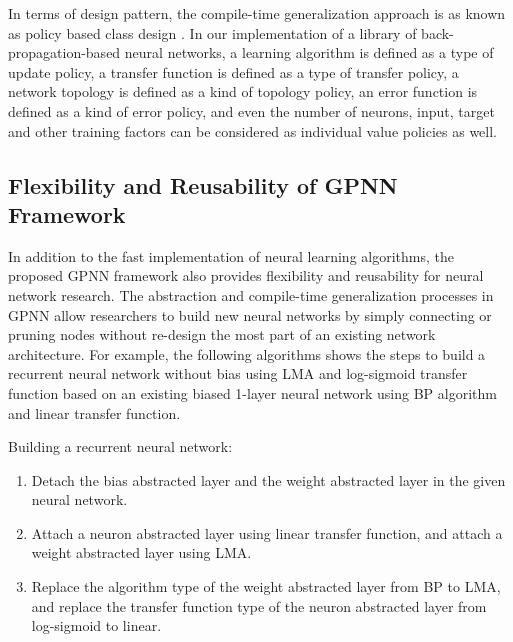 \documentclass[procedia]{easychair}
\begin{document}
In terms of design pattern, the compile-time generalization approach is as known as policy based class design \cite{alexandrescu2001policy}.  In our implementation of a library of back-propagation-based neural networks, a learning algorithm is defined as a type of update policy, a transfer function is defined as a type of transfer policy, a network topology is defined as a kind of topology policy, an error function is defined as a kind of error policy, and even the number of neurons, input, target and other training factors can be considered as individual value policies as well.

\subsection{Flexibility and Reusability of GPNN Framework}

In addition to the fast implementation of neural learning algorithms, the proposed GPNN framework also provides flexibility and reusability for neural network research.  The abstraction and compile-time generalization processes in GPNN allow researchers to build new neural networks by simply connecting or pruning nodes without re-design the most part of an existing network architecture.  For example, the following algorithms shows the steps to build a recurrent neural network without bias using LMA and log-sigmoid transfer function based on an existing biased 1-layer neural network using BP algorithm and linear transfer function.

Building a recurrent neural network:

\begin{enumerate}
    \item Detach the bias abstracted layer and the weight abstracted layer in the given neural network.
    \item Attach a neuron abstracted layer using linear transfer function, and attach a weight abstracted layer using LMA.
    \item Replace the algorithm type of the weight abstracted layer from BP to LMA, and replace the transfer function type of the neuron abstracted layer from log-sigmoid to linear.
\end{enumerate}
\end{document}
